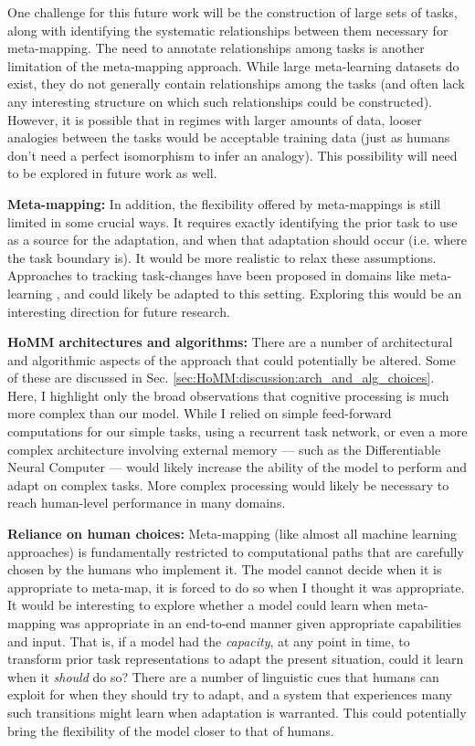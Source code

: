 One challenge for this future work will be the construction of large sets of tasks, along with identifying the systematic relationships between them necessary for meta-mapping. The need to annotate relationships among tasks is another limitation of the meta-mapping approach. While large meta-learning datasets do exist, they do not generally contain relationships among the tasks (and often lack any interesting structure on which such relationships could be constructed). However, it is possible that in regimes with larger amounts of data, looser analogies between the tasks would be acceptable training data (just as humans don't need a perfect isomorphism to infer an analogy). This possibility will need to be explored in future work as well. \par

\textbf{Meta-mapping:} In addition, the flexibility offered by meta-mappings is still limited in some crucial ways. It requires exactly identifying the prior task to use as a source for the adaptation, and when that adaptation should occur (i.e. where the task boundary is). It would be more realistic to relax these assumptions. Approaches to tracking task-changes have been proposed in domains like meta-learning \citep[e.g.][]{Nagabandi2019}, and could likely be adapted to this setting. Exploring this would be an interesting direction for future research. \par

\textbf{HoMM architectures and algorithms:} There are a number of architectural and algorithmic aspects of the approach that could potentially be altered. Some of these are discussed in Sec. \ref{sec:HoMM:discussion:arch_and_alg_choices}. Here, I highlight only the broad observations that cognitive processing is much more complex than our model. While I relied on simple feed-forward computations for our simple tasks, using a recurrent task network, or even a more complex architecture involving external memory --- such as the Differentiable Neural Computer \citep{Graves2016} --- would likely increase the ability of the model to perform and adapt on complex tasks. More complex processing would likely be necessary to reach human-level performance in many domains.\par 

\textbf{Reliance on human choices:} Meta-mapping (like almost all machine learning approaches) is fundamentally restricted to computational paths that are carefully chosen by the humans who implement it. The model cannot decide when it is appropriate to meta-map, it is forced to do so when I thought it was appropriate. It would be interesting to explore whether a model could learn when meta-mapping was appropriate in an end-to-end manner given appropriate capabilities and input. That is, if a model had the \emph{capacity}, at any point in time, to transform prior task representations to adapt the present situation, could it learn when it \emph{should} do so? There are a number of linguistic cues that humans can exploit for when they should try to adapt, and a system that experiences many such transitions might learn when adaptation is warranted. This could potentially bring the flexibility of the model closer to that of humans.\par 

